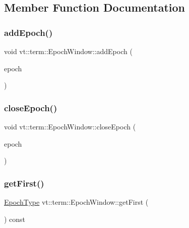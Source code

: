 \subsection{Member Function Documentation}
\mbox{\label{structvt_1_1term_1_1_epoch_window_a38502baeeae067a563d611e0e31e5e44}} 
\subsubsection{\texorpdfstring{add\+Epoch()}{addEpoch()}}
{\footnotesize\ttfamily void vt\+::term\+::\+Epoch\+Window\+::add\+Epoch (\begin{DoxyParamCaption}\item[{\hyperlink{namespacevt_a985a5adf291c34a3ca263b3378388236}{Epoch\+Type} const \&}]{epoch }\end{DoxyParamCaption})}

\mbox{\label{structvt_1_1term_1_1_epoch_window_ac4f58e068b8458f8fd8520474ab8e4c7}} 
\subsubsection{\texorpdfstring{close\+Epoch()}{closeEpoch()}}
{\footnotesize\ttfamily void vt\+::term\+::\+Epoch\+Window\+::close\+Epoch (\begin{DoxyParamCaption}\item[{\hyperlink{namespacevt_a985a5adf291c34a3ca263b3378388236}{Epoch\+Type} const \&}]{epoch }\end{DoxyParamCaption})}

\mbox{\label{structvt_1_1term_1_1_epoch_window_a2775ad5ee039b9c319403ec4184cdd1c}} 
\subsubsection{\texorpdfstring{get\+First()}{getFirst()}}
{\footnotesize\ttfamily \hyperlink{namespacevt_a985a5adf291c34a3ca263b3378388236}{Epoch\+Type} vt\+::term\+::\+Epoch\+Window\+::get\+First (\begin{DoxyParamCaption}{ }\end{DoxyParamCaption}) const\hspace{0.3cm}{\ttfamily [inline]}}

